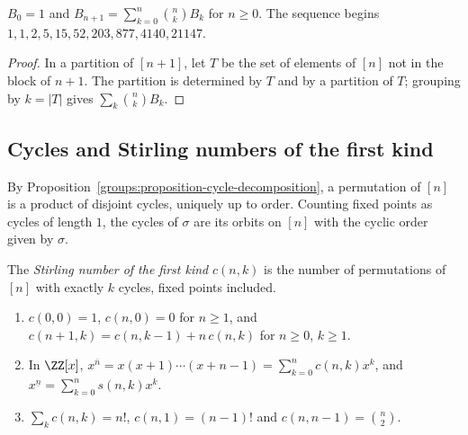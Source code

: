 \begin{proposition}\label{combinatorics:proposition-bell}
$B_0 = 1$ and $B_{n+1} = \sum_{k=0}^{n}\binom{n}{k}B_k$ for $n \geq 0$. The sequence begins $1, 1, 2, 5, 15, 52, 203, 877, 4140, 21147$.
\end{proposition}

\begin{proof}
In a partition of $[n + 1]$, let $T$ be the set of elements of $[n]$ not in the block of $n + 1$. The partition is determined by $T$ and by a partition of $T$; grouping by $k = |T|$ gives
$\sum_k\binom{n}{k}B_k$.
\end{proof}

\subsection{Cycles and Stirling numbers of the first kind}\label{combinatorics:subsection-stirling-first}

By Proposition~\ref{groups:proposition-cycle-decomposition}, a permutation of $[n]$ is a product of disjoint cycles, uniquely up to order. Counting fixed points as cycles of length $1$, the cycles of
$\sigma$ are its orbits on $[n]$ with the cyclic order given by $\sigma$.

\begin{definition}\label{combinatorics:definition-stirling-first}
The \emph{Stirling number of the first kind} $c(n, k)$ is the number of permutations of $[n]$ with exactly $k$ cycles, fixed points included.
\end{definition}

\begin{theorem}\label{combinatorics:theorem-stirling-first}
\begin{enumerate}
\item $c(0, 0) = 1$, $c(n, 0) = 0$ for $n \geq 1$, and $c(n + 1, k) = c(n, k - 1) + n\,c(n, k)$ for $n \geq 0$, $k \geq 1$.
\item In $\ZZ[x]$, $x^{\overline{n}} = x(x + 1) \cdots (x + n - 1) = \sum_{k=0}^{n}c(n, k)x^k$, and $x^{\underline{n}} = \sum_{k=0}^{n}s(n, k)x^k$.
\item $\sum_kc(n, k) = n!$, $c(n, 1) = (n - 1)!$ and $c(n, n - 1) = \binom{n}{2}$.
\end{enumerate}
\end{theorem}

